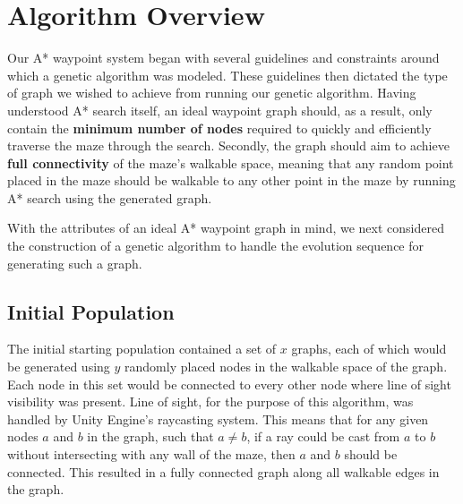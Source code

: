 \section{Algorithm Overview}
	Our A* waypoint system began with several guidelines and constraints around which a genetic algorithm was modeled. These guidelines then dictated the type of graph we wished to achieve from running our genetic algorithm. Having understood A* search itself, an ideal waypoint graph should, as a result, only contain the \textbf{minimum number of nodes} required to quickly and efficiently traverse the maze through the search. Secondly, the graph should aim to achieve \textbf{full connectivity} of the maze's walkable space, meaning that any random point placed in the maze should be walkable to any other point in the maze by running A* search using the generated graph.
	
	With the attributes of an ideal A* waypoint graph in mind, we next considered the construction of a genetic algorithm to handle the evolution sequence for generating such a graph.
	
	\subsection{Initial Population}
	The initial starting population contained a set of \(x\) graphs, each of which would be generated using \(y\) randomly placed nodes in the walkable space of the graph. Each node in this set would be connected to every other node where line of sight visibility was present. Line of sight, for the purpose of this algorithm, was handled by Unity Engine's raycasting system. This means that for any given nodes \(a\) and \(b\) in the graph, such that \(a \neq b\), if a ray could be cast from \(a\) to \(b\) without intersecting with any wall of the maze, then \(a\) and \(b\) should be connected. This resulted in a fully connected graph along all walkable edges in the graph.
	
